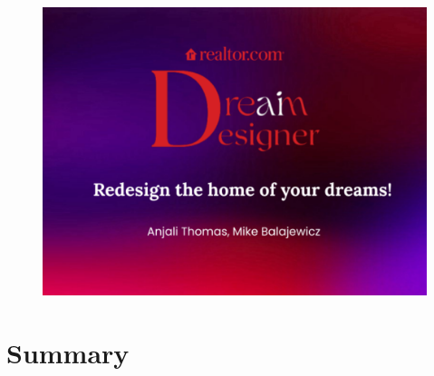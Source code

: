 \documentclass[t,xcolor={dvipsnames}]{beamer} %
\author[Thomas, A. \& Balajewicz, M.] {}
\date
  {May 12, 2023}
\begin{document}
\begin{frame}[plain]
  \begin{figure}[H]
    \includegraphics[width=\textwidth, height=0.95\textheight]{data/dream_designe_title.png}
  \end{figure}
\end{frame}

\section{Summary}

\addtocounter{framenumber}{-1}
\end{document}
